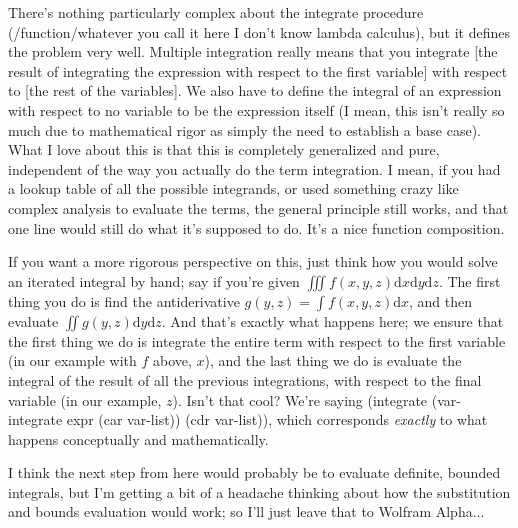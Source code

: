 \documentclass{article}
\begin{document}
There's nothing particularly complex about the integrate procedure (/function/whatever you call it here I don't know lambda calculus), but it defines the problem very well. Multiple integration really means that you integrate [the result of integrating the expression with respect to the first variable] with respect to [the rest of the variables]. We also have to define the integral of an expression with respect to no variable to be the expression itself (I mean, this isn't really so much due to mathematical rigor as simply the need to establish a base case). What I love about this is that this is completely generalized and pure, independent of the way you actually do the term integration. I mean, if you had a lookup table of all the possible integrands, or used something crazy like complex analysis to evaluate the terms, the general principle still works, and that one line would still do what it's supposed to do. It's a nice function composition.

If you want a more rigorous perspective on this, just think how you would solve an iterated integral by hand; say if you're given \( \iiint \! f(x,y,z) \mathrm{d}x \mathrm{d}y \mathrm{d}z \). The first thing you do is find the antiderivative \( g(y,z) = \int f(x,y,z) \mathrm{d}x \), and then evaluate \( \iint \! g(y,z) \mathrm{d}y \mathrm{d}z \). And that's exactly what happens here; we ensure that the first thing we do is integrate the entire term with respect to the first variable (in our example with \(f\) above, \(x\)), and the last thing we do is evaluate the integral of the result of all the previous integrations, with respect to the final variable (in our example, \(z\)). Isn't that cool? We're saying (integrate (var-integrate expr (car var-list)) (cdr var-list)), which corresponds \textit{exactly} to what happens conceptually and mathematically.

I think the next step from here would probably be to evaluate definite, bounded integrals, but I'm getting a bit of a headache thinking about how the substitution and bounds evaluation would work; so I'll just leave that to Wolfram Alpha...
\end{document}
